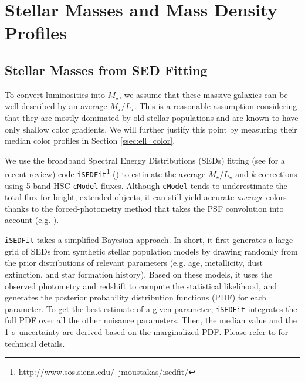 \documentclass[a4paper,fleqn,usenatbib]{mnras}
\def\cmodel{\texttt{cModel}}
\def\mstar{{$M_{\star}$}}
\def\m2l{{$M_{\star}/L_{\star}$}}
\begin{document}
\section{Stellar Masses and Mass Density Profiles}
    \label{sec:mstar}
    
\subsection{Stellar Masses from SED Fitting}
    \label{ssec:isedfit}
   
    To convert luminosities into \mstar{}, we assume that these massive galaxies 
    can be well described by an average \m2l{}. 
    This is a reasonable assumption considering that they are mostly dominated by 
    old stellar populations and are known to have only shallow color gradients. 
    We will further justify this point by measuring their median color profiles in 
    Section \ref{ssec:ell_color}.

    We use the broadband Spectral Energy Distributions (SEDs) fitting 
    (see \citealt{Walcher2011} for a recent review) code 
    \texttt{iSEDFit}\footnote{http://www.sos.siena.edu/~jmoustakas/isedfit/} 
    (\citealt{Moustakas13}) to estimate the average \m2l{} and $k$-corrections using
    5-band HSC \cmodel{} fluxes.
    Although \cmodel{} tends to underestimate the total flux for bright, extended 
    objects, it can still yield accurate \emph{average} colors thanks to the 
    forced-photometry method that takes the PSF convolution into account
    (e.g. \citealt{SynPipe}). 

    \texttt{iSEDFit} takes a simplified Bayesian approach. 
    In short, it first generates a large grid of SEDs from synthetic stellar 
    population models by drawing randomly from the prior distributions of relevant
    parameters (e.g. age, metallicity, dust extinction, and star formation history).
    Based on these models, it uses the observed photometry and redshift to compute 
    the statistical likelihood, and generates the posterior probability distribution 
    functions (PDF) for each parameter.  
    To get the best estimate of a given parameter, \texttt{iSEDFit} integrates the 
    full PDF over all the other nuisance parameters.
    Then, the median value and the 1-$\sigma$ uncertainty are derived based on the 
    marginalized PDF. 
    Please refer to \citet{Moustakas13} for technical details. 
    
\end{document}
